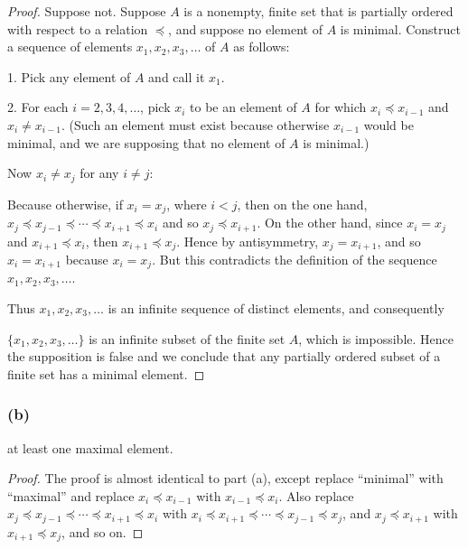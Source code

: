 \documentclass[14pt]{extarticle}
\begin{document}
\begin{proof}
        Suppose not. Suppose $A$ is a nonempty, finite set that is partially ordered with respect to a relation \(\preceq\),
        and suppose no element of $A$ is minimal. Construct a sequence of elements \(x_1, x_2, x_3, \ldots\) of $A$ as
        follows:

        1. Pick any element of $A$ and call it \(x_1\).

        2. For each \(i = 2, 3, 4, \ldots\), pick \(x_i\) to be an element of $A$ for which \(x_i \preceq x_{i-1}\) and \(x_i
        \neq x_{i-1}\). (Such an element must exist because otherwise \(x_{i-1}\) would be minimal, and we are
        supposing that no element of $A$ is minimal.)

        Now \(x_i \neq x_j\) for any \(i \neq j\):

        Because otherwise, if \(x_i = x_j\), where \(i < j\), then on the one hand, \(x_j \preceq x_{j-1} \preceq \cdots
        \preceq x_{i+1} \preceq x_i\) and so \(x_j \preceq x_{i+1}\). On the other hand, since \(x_i = x_j\) and \(x_{i+1}
        \preceq x_i\), then \(x_{i+1} \preceq x_j\). Hence by antisymmetry, \(x_j = x_{i+1}\), and so \(x_i = x_{i+1}\)
        because \(x_i = x_j\). But this contradicts the definition of the sequence \(x_1, x_2 , x_3, \ldots\).

        Thus \(x_1, x_2, x_3, \ldots\) is an infinite sequence of distinct elements, and consequently

        \(\{x_1, x_2, x_3, \ldots\}\) is an infinite subset of the finite set $A$, which is impossible. Hence the supposition
        is false and we conclude that any partially ordered subset of a finite set has a minimal element.
\end{proof}

\subsubsection{(b)}
at least one maximal element.

\begin{proof}
        The proof is almost identical to part (a), except replace ``minimal'' with ``maximal'' and replace \(x_i \preceq
        x_{i-1}\) with \(x_{i-1} \preceq x_i\). Also replace \(x_j \preceq x_{j-1} \preceq \cdots \preceq x_{i+1}\preceq x_i\)
        with \(x_i \preceq x_{i+1} \preceq \cdots \preceq x_{j-1} \preceq x_j\), and \(x_j \preceq x_{i+1}\) with \(x_{i+1}
        \preceq x_j\), and so on.
\end{proof}
\end{document}
